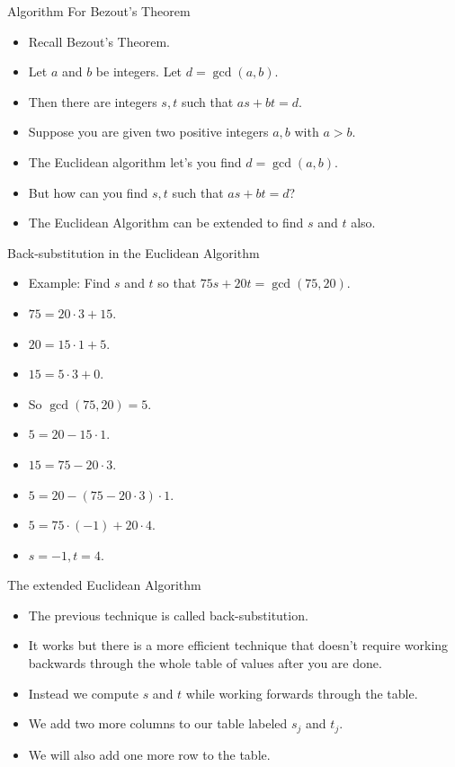 \documentclass[handout]{beamer}
\begin{document}
\begin{frame}{Algorithm For Bezout's Theorem}

\begin{itemize}
\item Recall Bezout's Theorem.
\item Let $a$ and $b$ be integers. Let $d=\gcd(a,b)$.
\item Then there are integers $s,t$ such that $as +bt = d$.
\item Suppose you are given two positive integers $a, b$ with $a>b$.
\item The Euclidean algorithm let's you find $d=\gcd(a,b)$.
\item But how can you find $s,t$ such that $as +bt = d$?
\item The Euclidean Algorithm can be extended to find $s$ and $t$ also.
\end{itemize}

\end{frame}

\begin{frame}{Back-substitution in the Euclidean Algorithm}

\begin{itemize}
  \item Example: Find $s$ and $t$ so that $75s+20t = \gcd(75, 20)$.
  \item $75 = 20\cdot 3 + 15$.
  \item $20 = 15 \cdot 1 + 5$.
  \item $15 = 5 \cdot 3 + 0$.
  \item So $\gcd(75, 20) = 5$.
  \item $5= 20 - 15 \cdot 1$.
  \item $15 = 75 -20 \cdot 3$.
  \item $5=20 - (75 - 20\cdot 3) \cdot 1$.
  \item $5 = 75 \cdot (-1) + 20 \cdot 4$.
  \item $s=-1, t=4$.
\end{itemize}

\end{frame}

\begin{frame}{The extended Euclidean Algorithm}

\begin{itemize}
  \item The previous technique is called back-substitution.
  \item It works but there is a more efficient technique that doesn't require
  working backwards through the whole table of values after you are done.
  \item Instead we compute $s$ and $t$ while working forwards through the table.
  \item We add two more columns to our table labeled $s_j$ and $t_j$.
  \item We will also add one more row to the table.
\end{itemize}

\end{frame}
\end{document}
